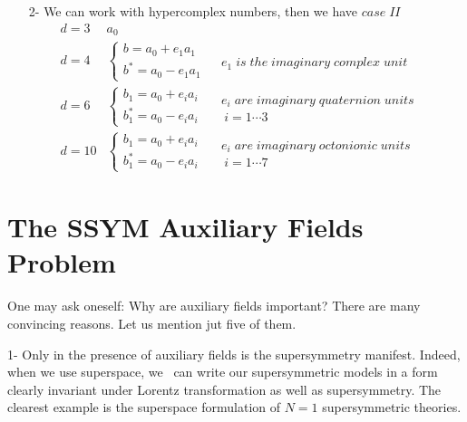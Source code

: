 \documentclass[a4paper,12pt]{book}
\begin{document}
\begin{itemize}
\item[2-]  We can work with hypercomplex numbers, then we have $case\;II$%
\begin{equation}
\begin{array}{llll}
d=3 & a_{0} & 
\begin{array}{l}
\end{array}
&  \\ 
d=4 & \left\{ 
\begin{array}{l}
b=a_{0}+e_{1}a_{1} \\ 
b^{*}=a_{0}-e_{1}a_{1}
\end{array}
\right. & 
\begin{array}{l}
\\ 
e_{1}\;is\;the\;imaginary\;complex\;unit
\end{array}
&  \\ 
d=6 & \left\{ 
\begin{array}{l}
b_{1}=a_{0}+e_{i}a_{i} \\ 
b_{1}^{*}=a_{0}-e_{i}a_{i}
\end{array}
\right. & 
\begin{array}{l}
\\ 
e_{i}\;are\;imaginary\;quaternion\;units \\ 
{\ i=1\cdots 3}
\end{array}
&  \\ 
d=10 & \left\{ 
\begin{array}{l}
b_{1}=a_{0}+e_{i}a_{i} \\ 
b_{1}^{*}=a_{0}-e_{i}a_{i}
\end{array}
\right. & 
\begin{array}{l}
\\ 
e_{i}\;are\;imaginary\;octonionic\;units \\ 
{\ i=1\cdots 7}
\end{array}
& 
\end{array}
\;
\end{equation}
\end{itemize}

\section{The SSYM Auxiliary Fields Problem}

One may ask oneself: Why are auxiliary fields important? There are many
convincing reasons. Let us mention jut five of them.

1- Only in the presence of auxiliary fields is the supersymmetry manifest.
Indeed, when we use superspace, we \ can write our supersymmetric models in
a form clearly invariant under Lorentz transformation as well as
supersymmetry. The clearest example is the superspace formulation of $N=1$
supersymmetric theories.
\end{document}

